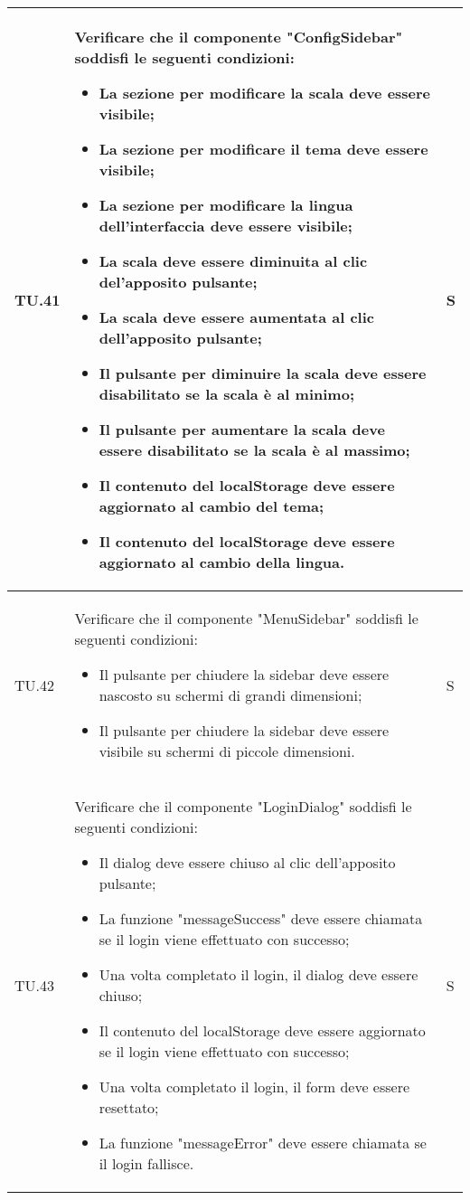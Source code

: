 \begin{adjustwidth}{-0.5cm}{-0.5cm}
\begin{longtable}{|P{1.5cm}|>{\raggedright}P{9.5cm}|>{\arraybackslash}P{1.5cm}|}
		\hline TU.41 & Verificare che il componente "ConfigSidebar" soddisfi le seguenti condizioni:
    \begin{itemize}
      \item La sezione per modificare la scala deve essere visibile;
			\item La sezione per modificare il tema deve essere visibile;
			\item La sezione per modificare la lingua dell'interfaccia deve essere visibile;
			\item La scala deve essere diminuita al clic del'apposito pulsante;
			\item La scala deve essere aumentata al clic dell'apposito pulsante;
			\item Il pulsante per diminuire la scala deve essere disabilitato se la scala è al minimo;
			\item Il pulsante per aumentare la scala deve essere disabilitato se la scala è al massimo;
			\item Il contenuto del localStorage deve essere aggiornato al cambio del tema;
			\item Il contenuto del localStorage deve essere aggiornato al cambio della lingua.
    \end{itemize} & S \\

		\hline TU.42 & Verificare che il componente "MenuSidebar" soddisfi le seguenti condizioni:
    \begin{itemize}
			\item Il pulsante per chiudere la sidebar deve essere nascosto su schermi di grandi dimensioni;
      \item Il pulsante per chiudere la sidebar deve essere visibile su schermi di piccole dimensioni.
    \end{itemize} & S \\

		\hline TU.43 & Verificare che il componente "LoginDialog" soddisfi le seguenti condizioni:
    \begin{itemize}
      \item Il dialog deve essere chiuso al clic dell'apposito pulsante;
			\item La funzione "messageSuccess" deve essere chiamata se il login viene effettuato con successo;
			\item Una volta completato il login, il dialog deve essere chiuso;
			\item Il contenuto del localStorage deve essere aggiornato se il login viene effettuato con successo;
			\item Una volta completato il login, il form deve essere resettato;
			\item La funzione "messageError" deve essere chiamata se il login fallisce.
    \end{itemize} & S \\


\end{longtable}
\end{adjustwidth}

